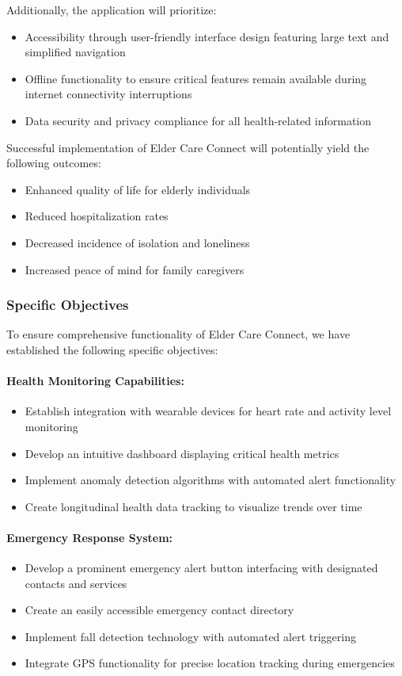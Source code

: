 Additionally, the application will prioritize:
\begin{itemize}
    \item Accessibility through user-friendly interface design featuring large text and simplified navigation
    \item Offline functionality to ensure critical features remain available during internet connectivity interruptions
    \item Data security and privacy compliance for all health-related information
\end{itemize}

Successful implementation of Elder Care Connect will potentially yield the following outcomes:
\begin{itemize}
    \item Enhanced quality of life for elderly individuals
    \item Reduced hospitalization rates
    \item Decreased incidence of isolation and loneliness
    \item Increased peace of mind for family caregivers
\end{itemize}

\subsubsection{Specific Objectives}

To ensure comprehensive functionality of Elder Care Connect, we have established the following specific objectives:

\paragraph{Health Monitoring Capabilities:}
\begin{itemize}
    \item Establish integration with wearable devices for heart rate and activity level monitoring
    \item Develop an intuitive dashboard displaying critical health metrics
    \item Implement anomaly detection algorithms with automated alert functionality
    \item Create longitudinal health data tracking to visualize trends over time
\end{itemize}

\paragraph{Emergency Response System:}
\begin{itemize}
    \item Develop a prominent emergency alert button interfacing with designated contacts and services
    \item Create an easily accessible emergency contact directory
    \item Implement fall detection technology with automated alert triggering
    \item Integrate GPS functionality for precise location tracking during emergencies
\end{itemize}

